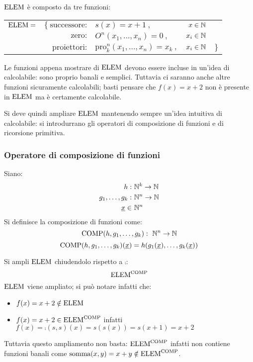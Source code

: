 $\text{ELEM}$ è composto da tre funzioni:

\begin{tabular}{l r l r l}
    $\text{ELEM} =$ & $\{ \ \text{successore:}$ & $s(x)=x+1\ ,$&$x\in\mathbb{N}$ &\\
              & $\text{zero:}$ & $O^n(x_1,\dots,x_n)=0\ ,$&$x_i\in\mathbb{N}$ &\\
              & $\text{proiettori:}$ & $\text{pro}^n_k(x_1,\dots,x_n)=x_k\ ,$&$x_i\in\mathbb{N}$&
                \hspace{-.3cm}$\}$ \\
\end{tabular}

Le funzioni appena mostrare di $\text{ELEM}$ devono essere incluse in un'idea di calcolabile:
sono proprio banali e semplici. Tuttavia ci saranno anche altre funzioni sicuramente calcolabili;
basti pensare che $f(x)=x+2$ non è presente in $\text{ELEM}$ ma è certamente calcolabile.

Si deve quindi ampliare $\text{ELEM}$ mantenendo sempre un'idea intuitiva di calcolabile: si
introdurrano gli operatori di composizione di funzioni e di ricorsione primitiva.

\subsubsection*{Operatore di composizione di funzioni}
Siano:
$$\begin{aligned}
    h:&\ \mathbb{N}^k\to\mathbb{N} \\
    g_1,\dots,g_k:&\ \mathbb{N}^n\to\mathbb{N} \\
    \text{\underline{$x$}}\in&\ \mathbb{N}^n
\end{aligned}$$
Si definisce la composizione di funzioni come:
$$\text{COMP}(h,g_1,\dots,g_k):\ \mathbb{N}^n\to\mathbb{N}$$
$$\text{COMP}(h,g_1,\dots,g_k)(\text{\underline{$x$}}) = h(g_1(\text{\underline{$x$}}),\dots,g_k(\text{\underline{$x$}}))$$

\begin{center}
    
\end{center}

Si ampli $\text{ELEM}$ chiudendolo rispetto a $\comp$:
$$ \text{ELEM}^{\text{COMP}} $$
$\text{ELEM}$ viene ampliato; si può notare infatti che:
\begin{itemize}
    \item $f(x)=x+2 \notin \text{ELEM}$
    \item $f(x)=x+2 \in \text{ELEM}^{\text{COMP}}$ infatti $f(x)=\comp(s,s)(x)=s(s(x))=s(x+1)=x+2$
\end{itemize}
Tuttavia questo ampliamento non basta: $\text{ELEM}^{\text{COMP}}$ infatti non contiene funzioni banali come
$\text{somma}(x,y)=x+y\notin\text{ELEM}^{\text{COMP}}$.

